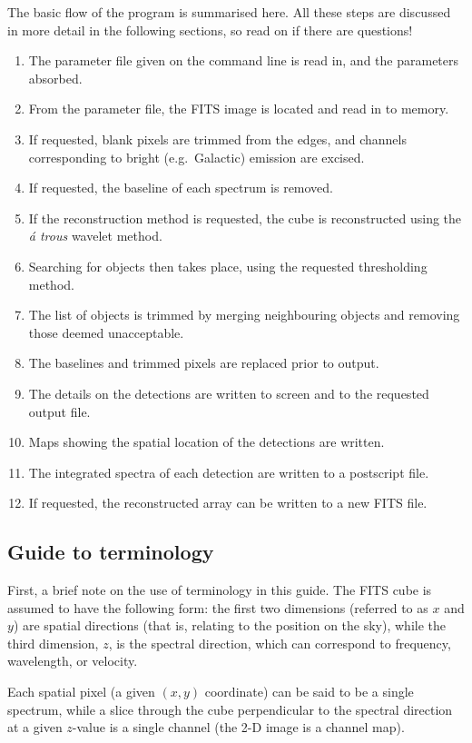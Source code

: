 \documentclass[12pt]{article}
\newcommand{\eg}{e.g.\ }
\begin{document}
The basic flow of the program is summarised here. All these steps are
discussed in more detail in the following sections, so read on if
there are questions!
\begin{enumerate}
\item The parameter file given on the command line is read in, and the
  parameters absorbed.
\item From the parameter file, the FITS image is located and read in
  to memory.
\item If requested, blank pixels are trimmed from the edges, and
  channels corresponding to bright (\eg Galactic) emission are
  excised. 
\item If requested, the baseline of each spectrum is removed.
\item If the reconstruction method is requested, the cube is
  reconstructed using the {\it {\' a} trous} wavelet method.
\item Searching for objects then takes place, using the requested
  thresholding method.
\item The list of objects is trimmed by merging neighbouring objects
  and removing those deemed unacceptable.
\item The baselines and trimmed pixels are replaced prior to output.
\item The details on the detections are written to screen and to the
  requested output file.
\item Maps showing the spatial location of the detections are written.
\item The integrated spectra of each detection are written to a
  postscript file. 
\item If requested, the reconstructed array can be written to a new
  FITS file.
\end{enumerate}

\subsection{Guide to terminology}

First, a brief note on the use of terminology in this guide. The FITS
cube is assumed to have the following form: the first two dimensions
(referred to as $x$ and $y$) are spatial directions (that is, relating
to the position on the sky), while the third dimension, $z$, is the
spectral direction, which can correspond to frequency, wavelength, or
velocity. 

Each spatial pixel (a given $(x,y)$ coordinate) can be said to be a
single spectrum, while a slice through the cube perpendicular to the
spectral direction at a given $z$-value is a single channel (the 2-D
image is a channel map).
\end{document}
